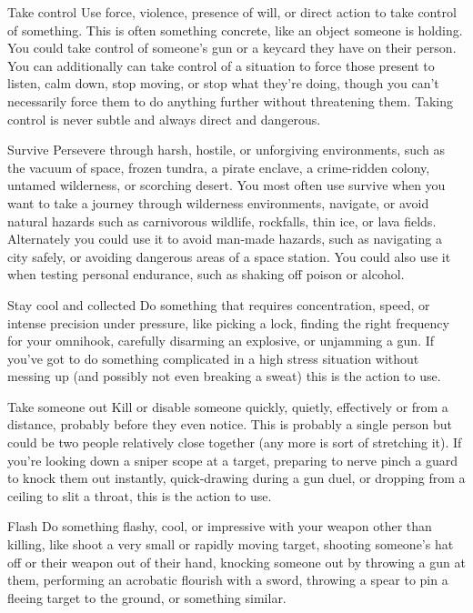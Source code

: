 Take control  
Use force, violence, presence of will, or direct action to take control of something. This is often  
something concrete, like an object someone is holding. You could take control of someone’s gun  
or a keycard they have on their person. You can additionally can take control of a situation to force  
those present to listen, calm down, stop moving, or stop what they’re doing, though you can’t  
necessarily force them to do anything further without threatening them. Taking control is never  
subtle and always direct and dangerous.  

Survive  
Persevere through harsh, hostile, or unforgiving environments, such as the vacuum of space,  
frozen tundra, a pirate enclave, a crime-ridden colony, untamed wilderness, or scorching desert.  
You most often use survive when you want to take a journey through wilderness environments,  
navigate, or avoid natural hazards such as carnivorous wildlife, rockfalls, thin ice, or lava fields.  
Alternately you could use it to avoid man-made hazards, such as navigating a city safely, or  
avoiding dangerous areas of a space station. You could also use it when testing personal  
endurance, such as shaking off poison or alcohol.  

Stay cool and collected  
Do something that requires concentration, speed, or intense precision under pressure, like picking  
a lock, finding the right frequency for your omnihook, carefully disarming an explosive, or  
unjamming a gun. If you’ve got to do something complicated in a high stress situation without  
messing up (and possibly not even breaking a sweat) this is the action to use.  

                                                                                                                   


Take someone out  
Kill or disable someone quickly, quietly, effectively or from a distance, probably before they even  
notice. This is probably a single person but could be two people relatively close together (any  
more is sort of stretching it). If you’re looking down a sniper scope at a target, preparing to nerve  
pinch a guard to knock them out instantly, quick-drawing during a gun duel, or dropping from a  
ceiling to slit a throat, this is the action to use.  

Flash  
Do something flashy, cool, or impressive with your weapon other than killing, like shoot a very  
small or rapidly moving target, shooting someone’s hat off or their weapon out of their hand,  
knocking someone out by throwing a gun at them, performing an acrobatic flourish with a sword,  
throwing a spear to pin a fleeing target to the ground, or something similar.  

